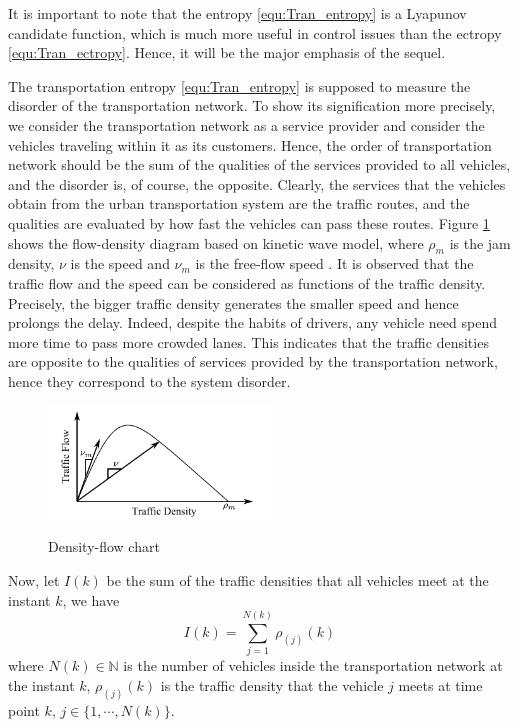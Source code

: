 \documentclass[preprint,authoryear,12pt]{elsarticle}
\begin{document}
It is important to note that the entropy \eqref{equ:Tran_entropy} is a Lyapunov candidate function, which is much more useful in control issues than the ectropy \eqref{equ:Tran_ectropy}. Hence, it will be the major emphasis of the sequel.

The transportation entropy \eqref{equ:Tran_entropy} is supposed to measure the disorder of the transportation network. To show its signification more precisely, we consider the transportation network as a service provider and consider the vehicles traveling within it as its customers. Hence, the order of transportation network should be the sum of the qualities of the services provided to all vehicles, and the disorder is, of course, the opposite. Clearly, the services that the vehicles obtain from the urban transportation system are the traffic routes, and the qualities are evaluated by how fast the vehicles can pass these routes. Figure \ref{fig:d_q} shows the flow-density diagram based on kinetic wave model, where $\rho_m$ is the jam density, $\nu$ is the speed and $\nu_m$ is the free-flow speed \citep{ukkusuri_robust_2010}. It is observed that the traffic flow and the speed can be considered as functions of the traffic density. Precisely, the bigger traffic density generates the smaller speed and hence prolongs the delay. Indeed, despite the habits of drivers, any vehicle need spend more time to pass more crowded lanes. This indicates that the traffic densities are opposite to the qualities of services provided by the transportation network, hence they correspond to the system disorder.

\begin{figure}[ht]
  \centering
  \includegraphics[height=3cm]{pics/d-q}\\
  \caption{Density-flow chart}
  \label{fig:d_q}
\end{figure}

Now, let $I(k)$ be the sum of the traffic densities that all vehicles meet at the instant $k$, we have
\begin{equation}
\label{equ:sum_density}
I(k)=\sum_{j=1}^{N(k)} \rho_{(j)}(k)
\end{equation}
where $N(k)\in\mathbb{N}$ is the number of vehicles inside the transportation network at the instant $k$, $\rho_{(j)}(k)$ is the traffic density that the vehicle $j$ meets at time point $k$, $j\in\{1,\cdots,N(k)\}$.
\end{document}
